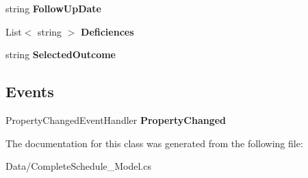 \begin{DoxyCompactItemize}
\item 
\mbox{\label{class_a_f_h___scheduler_1_1_data_1_1_complete_schedule___model_a0bbf44ec60f39ce727123fa8419c8af0}} 
string {\bfseries Follow\+Up\+Date}\hspace{0.3cm}{\ttfamily  [get, set]}
\item 
\mbox{\label{class_a_f_h___scheduler_1_1_data_1_1_complete_schedule___model_a42d3821b85252161ea6d888607fd9ef8}} 
List$<$ string $>$ {\bfseries Deficiences}\hspace{0.3cm}{\ttfamily  [get, set]}
\item 
\mbox{\label{class_a_f_h___scheduler_1_1_data_1_1_complete_schedule___model_aeb01ff3c40ab9bf4c1a30c16acd7735f}} 
string {\bfseries Selected\+Outcome}\hspace{0.3cm}{\ttfamily  [get, set]}
\end{DoxyCompactItemize}
\subsection*{Events}
\begin{DoxyCompactItemize}
\item 
\mbox{\label{class_a_f_h___scheduler_1_1_data_1_1_complete_schedule___model_a8a46a8cfbc6f65f5094a7ee0e10a3c72}} 
Property\+Changed\+Event\+Handler {\bfseries Property\+Changed}
\end{DoxyCompactItemize}


The documentation for this class was generated from the following file\+:\begin{DoxyCompactItemize}
\item 
Data/Complete\+Schedule\+\_\+\+Model.\+cs\end{DoxyCompactItemize}
